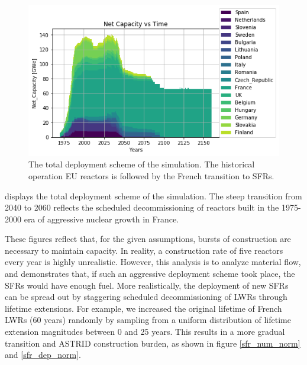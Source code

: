 \begin{figure}[htbp!]
    \begin{center}
        \includegraphics[scale=0.6]{./images/eu_future/onesim.png}
    \end{center}
    \caption{The total deployment scheme of the simulation. The historical
             operation \gls{EU} reactors is followed by the French
             transition to \glspl{SFR}.}
    \label{fig:tot_dep}
\end{figure}


 displays the total deployment
scheme of the simulation.
The steep transition from 2040 to 2060 reflects the scheduled
decommissioning of reactors built in the 1975-2000
era of aggressive nuclear growth in France.

These figures reflect that, for the given assumptions, bursts of construction
are necessary to maintain capacity.  In reality, a construction rate of five 
reactors every year is highly unrealistic. However, this analysis is to analyze 
material flow, and demonstrates that, if such an aggressive deployment scheme 
took place, the \glspl{SFR} would have enough fuel.  More realistically, the 
deployment of new \glspl{SFR} can be spread out by staggering scheduled 
decommissioning of \glspl{LWR} through lifetime extensions. For example,
we increased the original lifetime of French \glspl{LWR} (60 years) randomly 
by sampling from a uniform distribution of lifetime extension
magnitudes between 0 and 25 years. 
This results in a more gradual transition and \gls{ASTRID} construction
burden, as shown in figure \ref{sfr_num_norm} and \ref{sfr_dep_norm}.


